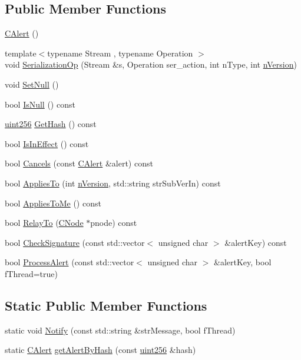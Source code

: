 \subsection*{Public Member Functions}
\begin{DoxyCompactItemize}
\item 
\hyperlink{class_c_alert_a116117e2318b9468a5ca80472c0b5157}{C\+Alert} ()
\item 
{\footnotesize template$<$typename Stream , typename Operation $>$ }\\void \hyperlink{class_c_alert_a51d73ab316bb42e65b87ec14ac536b14}{Serialization\+Op} (Stream \&s, Operation ser\+\_\+action, int n\+Type, int \hyperlink{class_c_unsigned_alert_ad8fad8e8f62caaf8162fad19170de2cf}{n\+Version})
\item 
void \hyperlink{class_c_alert_a93fd881c55ab448213787f49e316eb99}{Set\+Null} ()
\item 
bool \hyperlink{class_c_alert_ae7e110993e592a1a4f99379ab4fcfa08}{Is\+Null} () const 
\item 
\hyperlink{classuint256}{uint256} \hyperlink{class_c_alert_a59a57a4b4e93bd186ef18d4f09ebd844}{Get\+Hash} () const 
\item 
bool \hyperlink{class_c_alert_a00a8ae5ba7bc54ac7943558c33021190}{Is\+In\+Effect} () const 
\item 
bool \hyperlink{class_c_alert_a90d31fb31348f81b767f16dc5465871b}{Cancels} (const \hyperlink{class_c_alert}{C\+Alert} \&alert) const 
\item 
bool \hyperlink{class_c_alert_add9f485e29a3d1ffea20e6a5a4e42f26}{Applies\+To} (int \hyperlink{class_c_unsigned_alert_ad8fad8e8f62caaf8162fad19170de2cf}{n\+Version}, std\+::string str\+Sub\+Ver\+In) const 
\item 
bool \hyperlink{class_c_alert_a0a7fab6a971781904afb3e4a0ee29e12}{Applies\+To\+Me} () const 
\item 
bool \hyperlink{class_c_alert_ae89d673f6f1285eefcc343b3c029dab5}{Relay\+To} (\hyperlink{class_c_node}{C\+Node} $\ast$pnode) const 
\item 
bool \hyperlink{class_c_alert_ab14b68c1334a19ee4c419bfacd330e7c}{Check\+Signature} (const std\+::vector$<$ unsigned char $>$ \&alert\+Key) const 
\item 
bool \hyperlink{class_c_alert_af63a26aab450c2bc4781717e30ede67b}{Process\+Alert} (const std\+::vector$<$ unsigned char $>$ \&alert\+Key, bool f\+Thread=true)
\end{DoxyCompactItemize}
\subsection*{Static Public Member Functions}
\begin{DoxyCompactItemize}
\item 
static void \hyperlink{class_c_alert_a3da23857c8ed275621ee032a703c04a1}{Notify} (const std\+::string \&str\+Message, bool f\+Thread)
\item 
static \hyperlink{class_c_alert}{C\+Alert} \hyperlink{class_c_alert_aa37df9d177a6841ec5fa1e611c42b968}{get\+Alert\+By\+Hash} (const \hyperlink{classuint256}{uint256} \&hash)
\end{DoxyCompactItemize}
